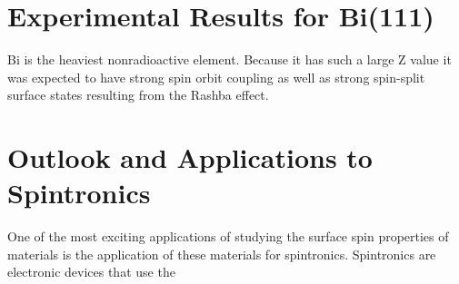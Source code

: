 \documentclass[12pt]{article}
\begin{document}
\section{Experimental Results for Bi(111)}
Bi is the heaviest nonradioactive element.
Because it has such a large Z value it was expected to have strong spin orbit coupling as well as strong spin-split surface states resulting from the Rashba effect.


\section{Outlook and Applications to Spintronics}
One of the most exciting applications of studying the surface spin properties of materials is the application of these materials for spintronics.
Spintronics are electronic devices that use the



\section{}



\end{document}
